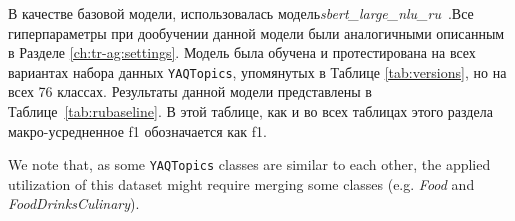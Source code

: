 \begin{table}[t]
\centering
{}
\caption{Размеры набора данных \texttt{YAQTopics} по классу и разбиению}
\label{tab:data_sizes}
\end{table}


В качестве базовой модели, использовалась модель\textit{sbert\_large\_nlu\_ru}~\cite{sbert_large_nlu_ru}.Все гиперпараметры при дообучении данной модели были аналогичными описанным в Разделе \ref{ch:tr-ag:settings}. Модель была обучена и протестирована на всех вариантах набора данных \texttt{YAQTopics}, упомянутых в Таблице \ref{tab:versions}, но на всех 76 классах. Результаты данной модели представлены в Таблице~\ref{tab:rubaseline}. В этой таблице, как и во всех таблицах этого раздела макро-усредненное f1 обозначается как f1.




We note that, as some \texttt{YAQTopics} classes are similar to each other, the applied utilization of this dataset might require merging some classes (e.g. \textit{Food} and \textit{FoodDrinksCulinary}). 

